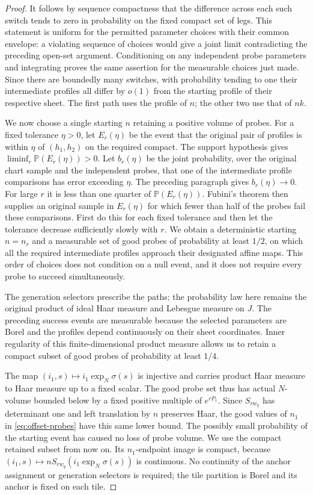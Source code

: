 \begin{proof}
It follows by sequence compactness that the difference across each such
switch tends to zero in probability on the fixed compact set of legs.
This statement is uniform for the permitted parameter choices with their
common envelope: a violating sequence of choices would give a joint limit
contradicting the preceding open-set argument.  Conditioning on any
independent probe parameters and integrating proves the same assertion
for the measurable choices just made.  Since there are boundedly many
switches, with probability tending to one their intermediate profiles
all differ by $o(1)$ from the starting profile of their respective sheet.
The first path uses the profile of $n$; the other two use that of $nk$.

We now choose a single starting $n$ retaining a positive volume of probes.
For a fixed tolerance $\eta>0$, let $E_r(\eta)$ be the event that the
original pair of profiles is within $\eta$ of $(h_1,h_2)$ on the required
compact.  The support hypothesis gives
$\liminf_r\mathbb P(E_r(\eta))>0$.  Let $b_r(\eta)$ be the joint
probability, over the original chart sample and the independent probes,
that one of the intermediate profile comparisons has error exceeding
$\eta$.  The preceding paragraph gives $b_r(\eta)\to0$.
For large $r$ it is less than one quarter of
$\mathbb P(E_r(\eta))$.  Fubini's theorem then supplies an original sample
in $E_r(\eta)$ for which fewer than half of the probes fail these
comparisons.  First do this for each fixed tolerance and then let the
tolerance decrease sufficiently slowly with $r$.  We obtain a
deterministic starting $n=n_r$ and a measurable set of good probes of
probability at least $1/2$, on which all the required intermediate
profiles approach their designated affine maps.  This order of choices
does not condition on a null event, and it does not require every probe
to succeed simultaneously.

The generation selectors prescribe the paths; the probability law here
remains the original product of ideal Haar measure and Lebesgue measure
on $J$.  The preceding success events are measurable because the selected
parameters are Borel and the profiles depend continuously on their sheet
coordinates.  Inner regularity of this finite-dimensional product measure
allows us to retain a compact subset of good probes of probability at
least $1/4$.

The map $(i_1,s)\mapsto i_1\exp_N\sigma(s)$ is injective and carries
product Haar measure to Haar measure up to a fixed scalar.  The good
probe set thus has actual $N$-volume bounded below by a fixed positive
multiple of $e^{rP_1}$.  Since $S_{rw_q}$ has determinant one and left
translation by $n$ preserves Haar, the good values of $n_1$ in
\eqref{eq:offset-probes} have this same lower bound.  The possibly small
probability of the starting event has caused no loss of probe volume.
We use the compact retained subset from now on.  Its $n_1$-endpoint image
is compact, because $(i_1,s)\mapsto nS_{rw_q}(i_1\exp_N\sigma(s))$ is
continuous.  No continuity of the anchor assignment or generation
selectors is required; the tile partition is Borel and its anchor is
fixed on each tile.


\end{proof}
